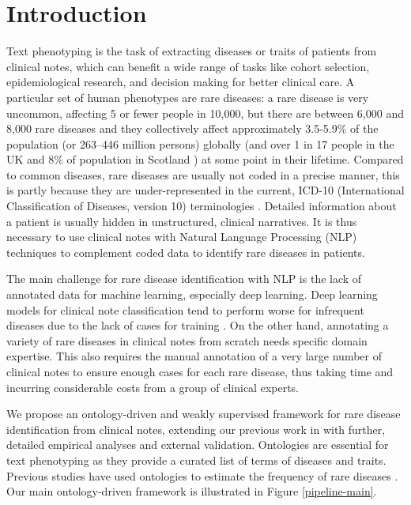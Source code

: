 \documentclass[twocolumn]{bmcart}
\begin{document}
\section*{Introduction}
\label{intro}
Text phenotyping is the task of extracting diseases or traits of patients from clinical notes, which can benefit a wide range of tasks like cohort selection, epidemiological research, and decision making for better clinical care. A particular set of human phenotypes are rare diseases: a rare disease is very uncommon, affecting 5 or fewer people in 10,000, but there are between 6,000 and 8,000 rare diseases and they collectively affect approximately 3.5-5.9\% of the population (or 263–446 million persons)
globally \cite{nguengang2020estimating} (and over 1 in 17 people in the UK \cite{uk_gov_2021} and 8\% of population in Scotland \cite{scot_gov_2021}) at some point in their lifetime. Compared to common diseases, rare diseases are usually not coded in a precise manner, this is partly because they are under-represented in the current, ICD-10 (International Classification of Diseases, version 10) terminologies \cite{richesson2014,Bearryman2016}. Detailed information about a patient is usually hidden in unstructured, clinical narratives. It is thus necessary to use clinical notes with Natural Language Processing (NLP) techniques to complement coded data to identify rare diseases in patients.

The main challenge for rare disease identification with NLP is the lack of annotated data for machine learning, especially deep learning. Deep learning models for clinical note classification tend to perform worse for infrequent diseases due to the lack of cases for training \cite{dong2021}. On the other hand, annotating a variety of rare diseases in clinical notes from scratch needs specific domain expertise. This also requires the manual annotation of a very large number of clinical notes to ensure enough cases for each rare disease, thus taking time and incurring considerable costs from a group of clinical experts.

We propose an ontology-driven and weakly supervised framework for rare disease identification from clinical notes, extending our previous work in \cite{dong2021rare} with further, detailed empirical analyses and external validation. Ontologies are essential for text phenotyping as they provide a curated list of terms of diseases and traits. Previous studies have used ontologies to estimate the frequency of rare diseases \cite{kahn2017ontology}. Our main ontology-driven framework is illustrated in Figure \ref{pipeline-main}. 
\end{document}
